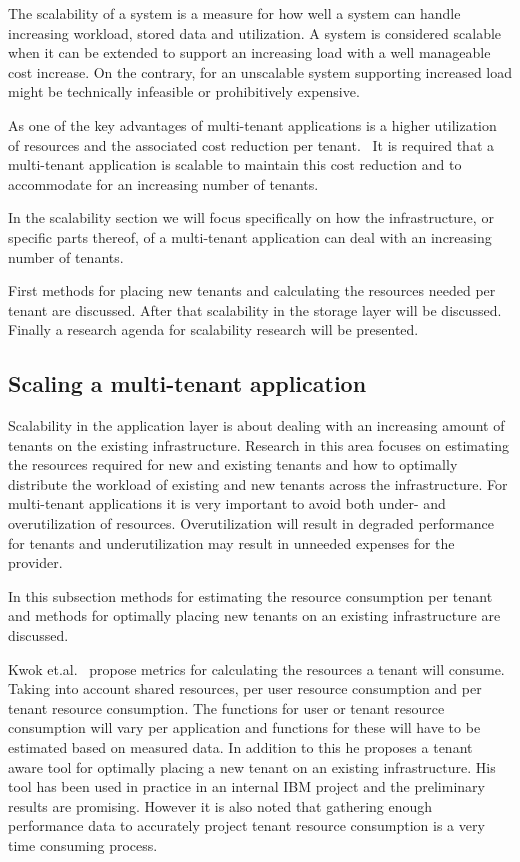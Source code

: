 The scalability of a system is a measure for how well a system can handle increasing workload, stored data and utilization.
A system is considered scalable when it can be extended to support an increasing load with a well manageable cost increase.
On the contrary, for an unscalable system supporting increased load might be technically infeasible or prohibitively expensive.~\cite{bondi2000scalability}

As one of the key advantages of multi-tenant applications is a higher utilization of resources and the associated cost reduction per tenant.~\cite{bezemer2010multi} 
It is required that a multi-tenant application is scalable to maintain this cost reduction and to accommodate for an increasing number of tenants.

In the scalability section we will focus specifically on how the infrastructure, or specific parts thereof, of a multi-tenant application can deal with an increasing number of tenants.

First methods for placing new tenants and calculating the resources needed per tenant are discussed. After that scalability in the  storage layer will be discussed. Finally a research agenda for scalability research will be presented.

\subsection{Scaling a multi-tenant application}
Scalability in the application layer is about dealing with an increasing amount of tenants on the existing infrastructure.
Research in this area focuses on estimating the resources required for new and existing tenants and how to optimally distribute the workload of existing and new tenants across the infrastructure. 
For multi-tenant applications it is very important to avoid both under- and overutilization of resources.
Overutilization will result in degraded performance for tenants and underutilization may result in unneeded expenses for the provider.

In this subsection methods for estimating the resource consumption per tenant and methods for optimally placing new tenants on an existing infrastructure are discussed.

Kwok et.al.~\cite{kwok2008resource} propose metrics for calculating the resources a tenant will consume.
Taking into account shared resources, per user resource consumption and per tenant resource consumption.
The functions for user or tenant resource consumption will vary per application and functions for these will have to be estimated based on measured data.
In addition to this he proposes a tenant aware tool for optimally placing a new tenant on an existing infrastructure.
His tool has been used in practice in an internal IBM project and the preliminary results are promising. 
However it is also noted that gathering enough performance data to accurately project tenant resource consumption is a very time consuming process.

